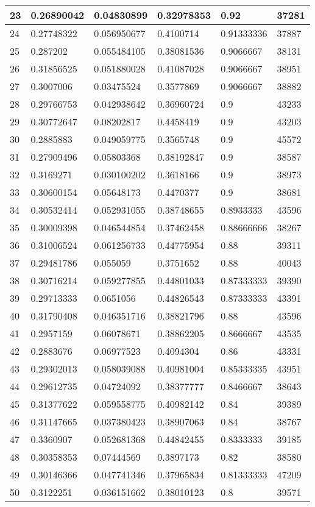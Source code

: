 \begin{longtable}{|l|l|l|l|l|l|}
23 & 0.26890042 & 0.04830899 & 0.32978353 & 0.92 & 37281 \\ \hline 
24 & 0.27748322 & 0.056950677 & 0.4100714 & 0.91333336 & 37887 \\ \hline 
25 & 0.287202 & 0.055484105 & 0.38081536 & 0.9066667 & 38131 \\ \hline 
26 & 0.31856525 & 0.051880028 & 0.41087028 & 0.9066667 & 38951 \\ \hline 
27 & 0.3007006 & 0.03475524 & 0.3577869 & 0.9066667 & 38882 \\ \hline 
28 & 0.29766753 & 0.042938642 & 0.36960724 & 0.9 & 43233 \\ \hline 
29 & 0.30772647 & 0.08202817 & 0.4458419 & 0.9 & 43203 \\ \hline 
30 & 0.2885883 & 0.049059775 & 0.3565748 & 0.9 & 45572 \\ \hline 
31 & 0.27909496 & 0.05803368 & 0.38192847 & 0.9 & 38587 \\ \hline 
32 & 0.3169271 & 0.030100202 & 0.3618166 & 0.9 & 38973 \\ \hline 
33 & 0.30600154 & 0.05648173 & 0.4470377 & 0.9 & 38681 \\ \hline 
34 & 0.30532414 & 0.052931055 & 0.38748655 & 0.8933333 & 43596 \\ \hline 
35 & 0.30009398 & 0.046544854 & 0.37462458 & 0.88666666 & 38267 \\ \hline 
36 & 0.31006524 & 0.061256733 & 0.44775954 & 0.88 & 39311 \\ \hline 
37 & 0.29481786 & 0.055059 & 0.3751652 & 0.88 & 40043 \\ \hline 
38 & 0.30716214 & 0.059277855 & 0.44801033 & 0.87333333 & 39390 \\ \hline 
39 & 0.29713333 & 0.0651056 & 0.44826543 & 0.87333333 & 43391 \\ \hline 
40 & 0.31790408 & 0.046351716 & 0.38821796 & 0.88 & 43596 \\ \hline 
41 & 0.2957159 & 0.06078671 & 0.38862205 & 0.8666667 & 43535 \\ \hline 
42 & 0.2883676 & 0.06977523 & 0.4094304 & 0.86 & 43331 \\ \hline 
43 & 0.29302013 & 0.058039088 & 0.40981004 & 0.85333335 & 43951 \\ \hline 
44 & 0.29612735 & 0.04724092 & 0.38377777 & 0.8466667 & 38643 \\ \hline 
45 & 0.31377622 & 0.059558775 & 0.40982142 & 0.84 & 39389 \\ \hline 
46 & 0.31147665 & 0.037380423 & 0.38907063 & 0.84 & 38767 \\ \hline 
47 & 0.3360907 & 0.052681368 & 0.44842455 & 0.8333333 & 39185 \\ \hline 
48 & 0.30358353 & 0.07444569 & 0.3897173 & 0.82 & 38580 \\ \hline 
49 & 0.30146366 & 0.047741346 & 0.37965834 & 0.81333333 & 47209 \\ \hline 
50 & 0.3122251 & 0.036151662 & 0.38010123 & 0.8 & 39571 \\ \hline 
\end{longtable}